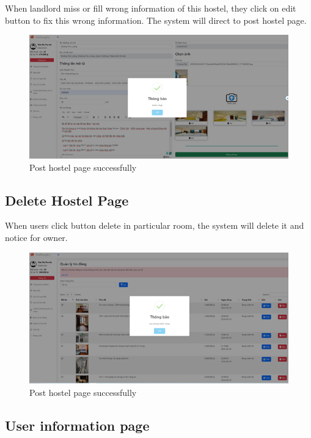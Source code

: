 \documentclass[../Main.tex]{subfiles}
\begin{document}
When landlord miss or fill wrong information of this hostel, they click on edit button to fix this wrong information.
The system will direct to post hostel page.

\begin{figure}[H]
    \centering
    \includegraphics[width=\textwidth]{Figure/Picture35.png}
    \caption{Post hostel page successfully}
\end{figure}

\subsection{Delete Hostel Page}

When users click button delete in particular room, the system will delete it and notice for owner.

\begin{figure}[H]
    \centering
    \includegraphics[width=\textwidth]{Figure/Picture38.png}
    \caption{Post hostel page successfully}
\end{figure}

\subsection{User information page }
\end{document}
